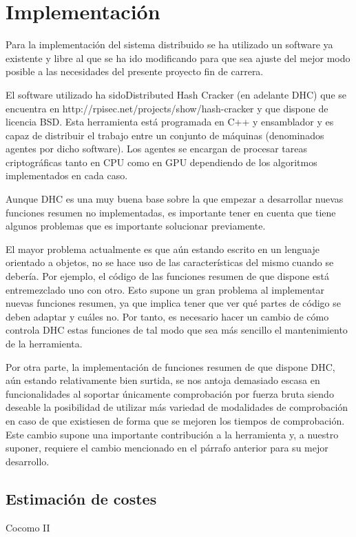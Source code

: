 \chapter{Implementación}

Para la implementación del sistema distribuido se ha utilizado un software ya existente y libre al que se ha ido modificando para que sea ajuste del mejor modo posible a las necesidades del presente proyecto fin de carrera.

El software utilizado ha sidoDistributed Hash Cracker (en adelante DHC) que se encuentra en http://rpisec.net/projects/show/hash-cracker y que dispone de licencia BSD. Esta herramienta está programada en C++ y ensamblador y es capaz de distribuir el trabajo entre un conjunto de máquinas (denominados agentes por dicho software). Los agentes se encargan de procesar tareas criptográficas tanto en CPU como en GPU dependiendo de los algoritmos implementados en cada caso.

Aunque DHC es una muy buena base sobre la que empezar a desarrollar nuevas funciones resumen no implementadas, es importante tener en cuenta que tiene algunos problemas que es importante solucionar previamente.

El mayor problema actualmente es que aún estando escrito en un lenguaje orientado a objetos, no se hace uso de las características del mismo cuando se debería. Por ejemplo, el código de las funciones resumen de que dispone está entremezclado uno con otro. Esto supone un gran problema al implementar nuevas funciones resumen, ya que implica tener que ver qué partes de código se deben adaptar y cuáles no. Por tanto, es necesario hacer un cambio de cómo controla DHC estas funciones de tal modo que sea más sencillo el mantenimiento de la herramienta.

Por otra parte, la implementación de funciones resumen de que dispone DHC, aún estando relativamente bien surtida, se nos antoja demasiado escasa en funcionalidades al soportar únicamente comprobación por fuerza bruta siendo deseable la posibilidad de utilizar más variedad de modalidades de comprobación en caso de que existiesen de forma que se mejoren los tiempos de comprobación. Este cambio supone una importante contribución a la herramienta y, a nuestro suponer, requiere el cambio mencionado en el párrafo anterior para su mejor desarrollo.

\section{Estimación de costes}
Cocomo II

